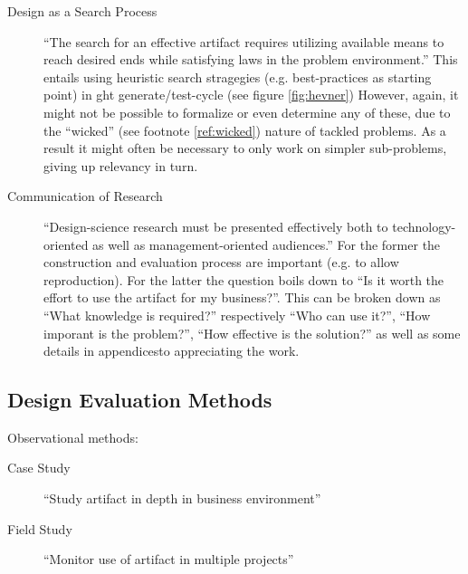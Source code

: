 \begin{description}
\item[Design as a Search Process]
``The search for an effective artifact requires utilizing available means to reach desired ends while satisfying laws in the problem environment.'' This entails using heuristic search stragegies (e.g. best-practices as starting point) in ght generate/test-cycle (see figure \ref{fig:hevner}) However, again, it might not be possible to formalize or even determine any of these, due to the ``wicked'' (see footnote \ref{ref:wicked}) nature of tackled problems. As a result it might often be necessary to only work on simpler sub-problems, giving up relevancy in turn.

\item[Communication of Research]
``Design-science research must be presented effectively both to technology-oriented as well as management-oriented audiences.'' For the former the construction and evaluation process are important (e.g. to allow reproduction). For the latter the question boils down to ``Is it worth the effort to use the artifact for my business?''. This can be broken down as ``What knowledge is required?'' respectively ``Who can use it?'', ``How imporant is the problem?'', ``How effective is the solution?'' as well as some details in appendicesto appreciating the work.

\end{description}



\subsection{Design Evaluation Methods}

Observational methods:

\begin{description}
  \item[Case Study] ``Study artifact in depth in business environment''
  \item[Field Study] ``Monitor use of artifact in multiple projects''
\end{description}

